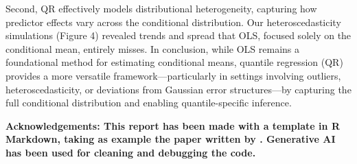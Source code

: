 \documentclass[fleqn,10pt]{latex/stylish_article} %
\begin{document}
Second, QR effectively models distributional heterogeneity, capturing how predictor effects vary across the conditional distribution. Our heteroscedasticity simulations (Figure 4) revealed trends and spread that OLS, focused solely on the conditional mean, entirely misses. In conclusion, while OLS remains a foundational method for estimating conditional means, quantile regression (QR) provides a more versatile framework---particularly in settings involving outliers, heteroscedasticity, or deviations from Gaussian error structures---by capturing the full conditional distribution and enabling quantile-specific inference.

\textbf{Acknowledgements: This report has been made with a template in R Markdown, taking as example the paper written by \citet{FanLi2001}. Generative AI has been used for cleaning and debugging the code.}



\makeatletter

\makeatother


\end{document}
